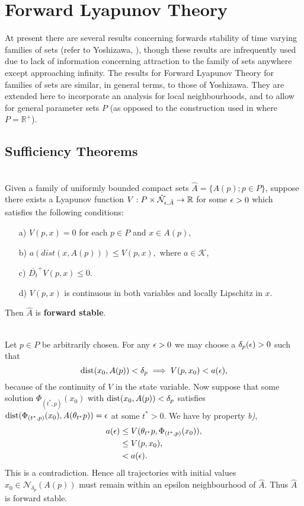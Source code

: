 \section{Forward Lyapunov Theory}
\label{FLyapsec}

At present there are several results concerning forwards stability of time
varying families of sets (refer to Yoshizawa, \cite{Yo66}), though these results
are infrequently used due to lack of information concerning attraction to the
family of sets anywhere except approaching infinity. The results for
Forward Lyapunov Theory for families of sets are similar, in general terms, to those of  Yoshizawa. They are extended here to incorporate an analysis for local
neighbourhoods, and to allow for general parameter sets $P$ (as opposed to the
construction used in \cite{Yo66} where $P=\mathbb{R}^+$).

\subsection{Sufficiency Theorems}

\begin{therm} \hfill \\ \label{fsthm}
  Given a family of uniformly bounded compact sets $\hat{A} =
  \{A(p);p   \in P \}$, suppose there exists a Lyapunov function $V: P \times
  \hat{\mathcal{N}}_{\epsilon, \hat{A}} \to \mathbb{R}$ for some $\epsilon > 0$ which
  satisfies the following conditions:
\begin{itemize}
  \item[a)] $V(p, x) = 0$ for each $p \in P$ and $x \in A(p),$
  \item[b)] $a(dist( x, A(p))) \leq V(p, x),$
    where $a \in \mathcal{K}$,
  \item[c)] $\overline{D_t}^+ V(p, x) \leq 0$.
  \item[d)] $V(p, x)$ is continuous in both variables and locally Lipschitz in
    $x$.
\end{itemize}
Then $\hat{A}$ is \textbf{forward stable}.
\end{therm}
\begin{prf} \hfill \\
Let $p \in P$ be arbitrarily chosen. For any $\epsilon > 0$ we may choose a
$\delta_p(\epsilon) > 0$ such that
\[ {\rm dist}(x_0, A(p)) < \delta_p \implies V(p, x_0) < a( \epsilon), \]
because of the continuity of $V$ in the state variable. Now suppose that
some solution $\Phi_{(t^*, p)}(x_0)$ with ${\rm dist}(x_0, A(p)) < \delta_p$ satisfies
${\rm dist}( \Phi_{(t^*, p)}(x_0), A(\theta_{t^*}p)) = \epsilon$ at some $t^* > 0$.
We have by property {\em b)},
\begin{align*}
  a( \epsilon ) &\leq V(\theta_{t^*}p, \Phi_{(t^*, p)}(x_0) ), \\
  &\leq V(p, x_0), \\
  &< a( \epsilon).
\end{align*}
This is a contradiction. Hence all trajectories with initial values
$x_0 \in \mathcal{N}_{\delta_p}(A(p))$ must remain within an
epsilon neighbourhood of $\hat{A}$. Thus $\hat{A}$ is forward stable.
\end{prf}

